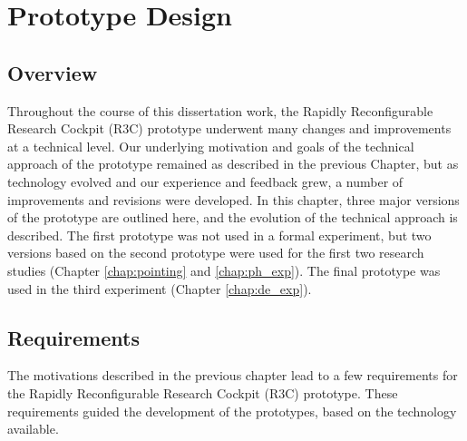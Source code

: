 \chapter{Prototype Design}
\label{chap:prototype}

\section{Overview}

Throughout the course of this dissertation work, the Rapidly Reconfigurable Research Cockpit (R3C) prototype underwent many changes and improvements at a technical level.
Our underlying motivation and goals of the technical approach of the prototype remained as described in the previous Chapter, but as technology evolved and our experience and feedback grew, a number of improvements and revisions were developed.
In this chapter, three major versions of the prototype are outlined here, and the evolution of the technical approach is described.
The first prototype was not used in a formal experiment, but two versions based on the second prototype were used for the first two research studies (Chapter \ref{chap:pointing} and \ref{chap:ph_exp}).
The final prototype was used in the third experiment (Chapter \ref{chap:de_exp}).

\section{Requirements}

The motivations described in the previous chapter lead to a few requirements for the Rapidly Reconfigurable Research Cockpit (R3C) prototype.
These requirements guided the development of the prototypes, based on the technology available.

